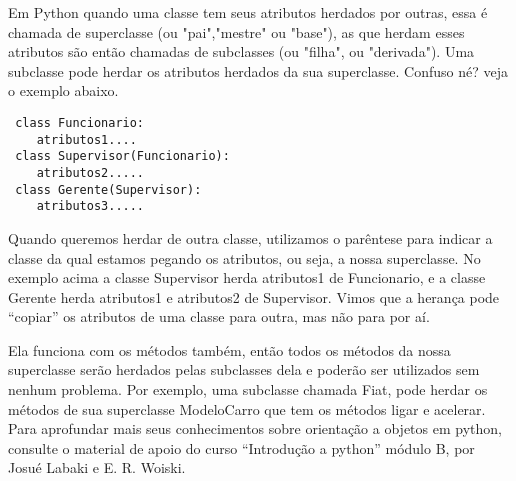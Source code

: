 \documentclass[11pt,a4paper]{article}
\begin{document}
Em Python quando uma classe tem seus atributos herdados por outras, essa é chamada de
superclasse (ou "pai","mestre" ou "base"), as que herdam esses atributos são então
chamadas de subclasses (ou "filha", ou "derivada"). Uma subclasse pode herdar os
atributos herdados da sua superclasse. Confuso né? veja o exemplo abaixo.
\vspace{0.1in}
\begin{lstlisting}
 class Funcionario:
	atributos1....
 class Supervisor(Funcionario):
	atributos2.....
 class Gerente(Supervisor):
	atributos3.....
\end{lstlisting}

\vspace{0.1in}
Quando queremos herdar de outra classe, utilizamos o parêntese para indicar a classe da
qual estamos pegando os atributos, ou seja, a nossa superclasse. No exemplo acima a
classe Supervisor herda atributos1 de Funcionario, e a classe Gerente herda atributos1 e
atributos2 de Supervisor.
Vimos que a herança pode “copiar” os atributos de uma classe para outra, mas não para por
aí. 

\vspace{0.1in}

Ela funciona com os métodos também, então todos os métodos da nossa superclasse
serão herdados pelas subclasses dela e poderão ser utilizados sem nenhum problema. Por
exemplo, uma subclasse chamada Fiat, pode herdar os métodos de sua superclasse
ModeloCarro que tem os métodos ligar e acelerar.
Para aprofundar mais seus conhecimentos sobre orientação a objetos em python, consulte
o material de apoio do curso “Introdução a python” módulo B, por Josué Labaki e E. R.
Woiski.
\end{document}
